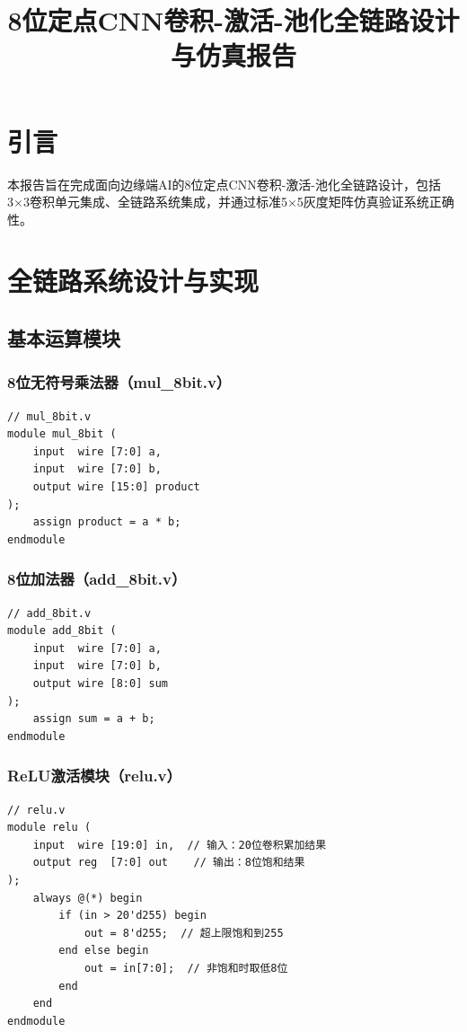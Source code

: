 \documentclass{ctexart}
\title{8位定点CNN卷积-激活-池化全链路设计与仿真报告}
\author{}
\date{}
\begin{document}
\maketitle

\section{引言}
本报告旨在完成面向边缘端AI的8位定点CNN卷积-激活-池化全链路设计，包括3×3卷积单元集成、全链路系统集成，并通过标准5×5灰度矩阵仿真验证系统正确性。

\section{全链路系统设计与实现}

\subsection{基本运算模块}
\subsubsection{8位无符号乘法器（mul\_8bit.v）}
\begin{lstlisting}[style=verilog, caption=mul\_8bit.v]
// mul_8bit.v
module mul_8bit (
    input  wire [7:0] a,
    input  wire [7:0] b,
    output wire [15:0] product
);
    assign product = a * b;
endmodule
\end{lstlisting}

\subsubsection{8位加法器（add\_8bit.v）}
\begin{lstlisting}[style=verilog, caption=add\_8bit.v]
// add_8bit.v
module add_8bit (
    input  wire [7:0] a,
    input  wire [7:0] b,
    output wire [8:0] sum
);
    assign sum = a + b;
endmodule
\end{lstlisting}

\subsubsection{ReLU激活模块（relu.v）}
\begin{lstlisting}[style=verilog, caption=relu.v]
// relu.v
module relu (
    input  wire [19:0] in,  // 输入：20位卷积累加结果
    output reg  [7:0] out    // 输出：8位饱和结果
);
    always @(*) begin
        if (in > 20'd255) begin
            out = 8'd255;  // 超上限饱和到255
        end else begin
            out = in[7:0];  // 非饱和时取低8位
        end
    end
endmodule
\end{lstlisting}
\end{document}
